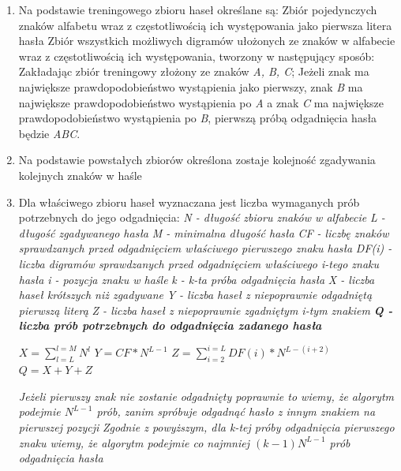\documentclass{article}
\begin{document}
	\begin{enumerate}
		\item Na podstawie treningowego zbioru haseł określane są:
		\subitem Zbiór pojedynczych znaków alfabetu wraz z częstotliwością ich występowania jako pierwsza litera hasła 
		\subitem Zbiór wszystkich możliwych digramów ułożonych ze znaków w alfabecie wraz z częstotliwością ich występowania, tworzony w następujący sposób:
		\subsubitem Zakładając zbiór treningowy złożony ze znaków \textit{A, B, C}; Jeżeli znak  ma największe prawdopodobieństwo wystąpienia jako pierwszy, znak \textit{B} ma największe prawdopodobieństwo wystąpienia po \textit{A} a znak \textit{C} ma największe prawdopodobieństwo wystąpienia po \textit{B}, pierwszą próbą odgadnięcia hasła będzie \textit{ABC}.
		\item Na podstawie powstałych zbiorów określona zostaje kolejność zgadywania kolejnych znaków w haśle	
		
		\item Dla właściwego zbioru haseł wyznaczana jest liczba wymaganych prób potrzebnych do jego odgadnięcia:
		\subitem \textit{N - długość zbioru znaków w alfabecie}
		\subitem \textit{L - długość zgadywanego hasła}
		\subitem \textit{M - minimalna długość hasła}
		\subitem \textit{CF - liczbę znaków sprawdzanych przed odgadnięciem właściwego pierwszego znaku hasła}
		\subitem \textit{DF(i) - liczba digramów sprawdzanych przed odgadnięciem właściwego i-tego znaku hasła}
		\subitem \textit{i - pozycja znaku w haśle}
		\subitem \textit{k - k-ta próba odgadnięcia hasła}
		\subitem \textit{X - liczba haseł krótszych niż zgadywane}
		\subitem \textit{Y - liczba haseł z niepoprawnie odgadniętą pierwszą literą}
		\subitem \textit{Z - liczba haseł z niepoprawnie zgadniętym i-tym znakiem}
		\subitem \textbf{\textit{Q - liczba prób potrzebnych do odgadnięcia zadanego hasła}}
		
		\subitem $ X = \sum_{l = L}^{l = M} N^l $		
		\subitem $ Y = CF * N^{L-1} $		
		\subitem $ Z = \sum_{i = 2}^{i = L} DF(i) * N^{L - (i + 2)} $		
		\subitem $ Q = X + Y + Z $
		
		\subitem \textit{Jeżeli pierwszy znak nie zostanie odgadnięty poprawnie to wiemy, że algorytm podejmie $ N^{L-1} $ prób, zanim spróbuje odgadnąć hasło z innym znakiem na pierwszej pozycji}
		\subitem \textit{Zgodnie z powyższym, dla k-tej próby odgadnięcia pierwszego znaku wiemy, że algorytm podejmie co najmniej $ (k-1)N^{L-1} $ prób odgadnięcia hasła}
	\end{enumerate}
\end{document}
